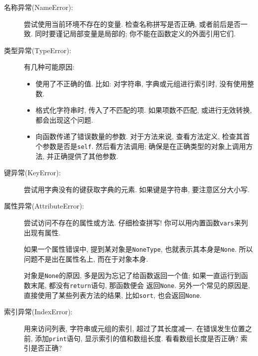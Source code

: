 \documentclass[10pt]{book}
\begin{document}
\begin{description}

\item[名称异常(NameError):] 尝试使用当前环境不存在的变量. 
检查名称拼写是否正确, 或者前后是否一致. 
同时要谨记局部变量是局部的; 你不能在函数定义的外面引用它们.

\item[类型异常(TypeError):] 有几种可能原因:

\begin{itemize}

\item  使用了不正确的值. 比如: 对字符串, 字典或元组进行索引时, 没有使用整数. 

\item 格式化字符串时, 传入了不匹配的项. 
如果项数不匹配, 或进行无效转换, 都会出现这个问题. 

\item 向函数传递了错误数量的参数. 对于方法来说, 查看方法定义, 
检查其首个参数是否是{\tt self}.
然后看方法调用; 确保是在正确类型的对象上调用方法, 
并正确提供了其他参数. 

\end{itemize}

\item[键异常(KeyError):]  尝试用字典没有的键获取字典的元素. 
如果键是字符串, 要注意区分大小写. 

\item[属性异常(AttributeError):] 尝试访问不存在的属性或方法. 
仔细检查拼写! 你可以用内置函数{\tt vars}来列出现有属性. 

如果一个属性错误中, 提到某对象是{\tt NoneType},
也就表示其本身是{\tt None}.
所以问题不是出在属性名上, 而在于对象本身. 

对象是{\tt None}的原因, 多是因为忘记了给函数返回一个值;
如果一直运行到函数末尾, 都没有{\tt return}语句, 那函数便会
返回{\tt None}. 
另外一个常见的原因是, 直接使用了某些列表方法的结果, 比如{\tt sort}, 
也会返回{\tt None}.

\item[索引异常(IndexError):] 用来访问列表, 字符串或元组的索引, 超过了其长度减一. 
在错误发生位置之前, 添加{\tt print}语句, 显示索引的值和数组长度. 
看看数组长度是否正确? 索引是否正确?

\end{description}
\end{document}
